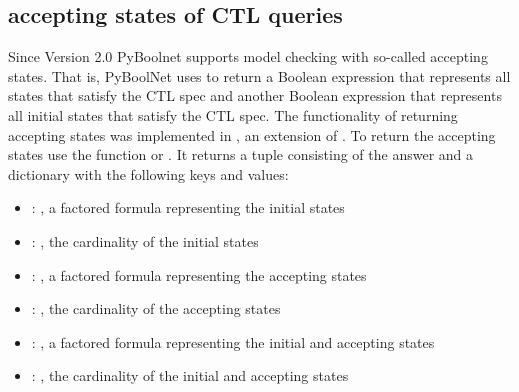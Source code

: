 \documentclass[letterpaper,10pt,english]{sphinxmanual}
\begin{document}
\begin{sphinxVerbatim}[commandchars=\\\{\}]
      
  \PYG{p}{[}\PYG{p}{]}
\end{sphinxVerbatim}


\subsection{accepting states of CTL queries}
\label{\detokenize{Manual:accepting-states-of-ctl-queries}}
Since Version 2.0 PyBoolnet supports model checking with so-called accepting states.
That is, PyBoolNet uses  to return a Boolean expression that represents all states that satisfy the CTL spec and another Boolean
expression that represents all initial states that satisfy the CTL spec.
The functionality of returning accepting states was implemented in , an extension of .
To return the accepting states use the function {\hyperref[\detokenize{ModelChecking:check-primes-with-acceptingstates}]{}} or {\hyperref[\detokenize{ModelChecking:check-smv-with-acceptingstates}]{}}.
It returns a tuple consisting of the answer and a dictionary with the following keys and values:
\begin{itemize}
\item {} 
: , a factored formula representing the initial states

\item {} 
: , the cardinality of the initial states

\item {} 
: , a factored formula representing the accepting states

\item {} 
: , the cardinality of the accepting states

\item {} 
: , a factored formula representing the initial and accepting states

\item {} 
: , the cardinality of the initial and accepting states

\end{itemize}
\end{document}
